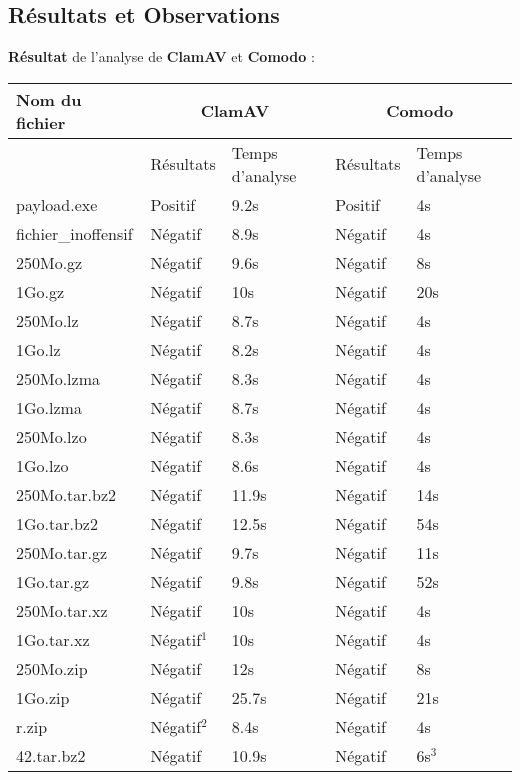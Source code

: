 \documentclass[smallextended]{svjour3}       %
\begin{document}
\subsection{Résultats et Observations}
\label{3.2résultats}
\textbf{Résultat} de l'analyse de \textbf{ClamAV} et \textbf{Comodo} :\\
$ $\\
\begin{tabular}{|l|l|l|l|l|}
  \hline
  \textbf{Nom du fichier} & \multicolumn{2}{|c|}{\textbf{ClamAV}} & \multicolumn{2}{|c|}{\textbf{Comodo}}\\
  \hline
   & Résultats & Temps d'analyse & Résultats & Temps d'analyse \\
  \hline
  \hline
payload.exe & Positif & 9.2s & Positif & 4s\\
	\hline
fichier\_inoffensif & Négatif & 8.9s & Négatif & 4s\\
	\hline
	\hline
250Mo.gz &  Négatif  & 9.6s & Négatif & 8s\\
	\hline
1Go.gz &  Négatif  & 10s & Négatif & 20s\\
    \hline
    \hline
250Mo.lz &  Négatif  & 8.7s & Négatif & 4s\\
	\hline
1Go.lz &  Négatif & 8.2s & Négatif & 4s\\
    \hline
    \hline
250Mo.lzma &  Négatif  &  8.3s & Négatif & 4s\\
	\hline
1Go.lzma &  Négatif  & 8.7s & Négatif & 4s\\
    \hline
    \hline
250Mo.lzo &   Négatif & 8.3s & Négatif & 4s\\
	\hline
1Go.lzo &  Négatif  & 8.6s & Négatif & 4s\\
    \hline
    \hline
250Mo.tar.bz2 &  Négatif & 11.9s & Négatif & 14s\\
	\hline
1Go.tar.bz2 &  Négatif  &  12.5s & Négatif & 54s\\
    \hline
    \hline
250Mo.tar.gz &   Négatif & 9.7s & Négatif & 11s\\
	\hline
1Go.tar.gz &  Négatif  & 9.8s & Négatif & 52s\\
    \hline
    \hline
250Mo.tar.xz &  Négatif  & 10s & Négatif & 4s\\
	\hline
1Go.tar.xz &  Négatif$^1$  &  10s & Négatif & 4s\\
    \hline
    \hline
250Mo.zip &   Négatif & 12s & Négatif & 8s\\
	\hline
1Go.zip &   Négatif & 25.7s & Négatif & 21s\\
    \hline
    \hline
r.zip & Négatif$^2$ & 8.4s & Négatif & 4s\\
	\hline
42.tar.bz2 & Négatif  & 10.9s & Négatif & 6s$^3$\\
	\hline
\end{tabular}
\end{document}
